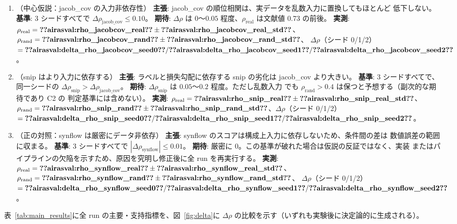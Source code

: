 \documentclass[11pt]{article}
\providecommand{\airasval}[1]{\textbf{??airasval:\detokenize{#1}??}}
\providecommand{\unverified}[1]{#1}
\begin{document}
\begin{enumerate}
  \item[\textbf{C1}]（中心仮説：jacob\_cov の入力非依存性）
  \textbf{主張}: jacob\_cov の順位相関は、実データを乱数入力に置換してもほとんど
  低下しない。
  \textbf{基準}: 3 シードすべてで $\Delta\rho_{\mathrm{jacob\_cov}} \le 0.10$。
  \textbf{期待}: $\Delta\rho$ は $0$〜$0.05$ 程度、$\rho_{\mathrm{real}}$ は文献値
  \unverified{0.73} の前後。
  \textbf{実測}: $\rho_{\mathrm{real}} = \airasval{rho_jacobcov_real} \pm
  \airasval{rho_jacobcov_real_std}$、$\rho_{\mathrm{rand}} =
  \airasval{rho_jacobcov_rand} \pm \airasval{rho_jacobcov_rand_std}$、
  $\Delta\rho$（シード 0/1/2）$= \airasval{delta_rho_jacobcov_seed0} /
  \airasval{delta_rho_jacobcov_seed1} / \airasval{delta_rho_jacobcov_seed2}$。

  \item[\textbf{C2}]（snip はより入力に依存する）
  \textbf{主張}: ラベルと損失勾配に依存する snip の劣化は jacob\_cov より大きい。
  \textbf{基準}: 3 シードすべてで、同一シードの
  $\Delta\rho_{\mathrm{snip}} > \Delta\rho_{\mathrm{jacob\_cov}}$。
  \textbf{期待}: $\Delta\rho_{\mathrm{snip}}$ は $0.05$〜$0.2$ 程度。ただし乱数入力
  でも $\rho_{\mathrm{rand}} > 0.4$ は保つと予想する（副次的な期待であり C2 の
  判定基準には含めない）。
  \textbf{実測}: $\rho_{\mathrm{real}} = \airasval{rho_snip_real} \pm
  \airasval{rho_snip_real_std}$、$\rho_{\mathrm{rand}} = \airasval{rho_snip_rand}
  \pm \airasval{rho_snip_rand_std}$、$\Delta\rho$（シード 0/1/2）$=
  \airasval{delta_rho_snip_seed0} / \airasval{delta_rho_snip_seed1} /
  \airasval{delta_rho_snip_seed2}$。

  \item[\textbf{C3}]（正の対照：synflow は厳密にデータ非依存）
  \textbf{主張}: synflow のスコアは構成上入力に依存しないため、条件間の差は
  数値誤差の範囲に収まる。
  \textbf{基準}: 3 シードすべてで $|\Delta\rho_{\mathrm{synflow}}| \le 0.01$。
  \textbf{期待}: 厳密に $0$。この基準が破れた場合は仮説の反証ではなく、実装
  またはパイプラインの欠陥を示すため、原因を究明し修正後に全 run を再実行する。
  \textbf{実測}: $\rho_{\mathrm{real}} = \airasval{rho_synflow_real} \pm
  \airasval{rho_synflow_real_std}$、$\rho_{\mathrm{rand}} =
  \airasval{rho_synflow_rand} \pm \airasval{rho_synflow_rand_std}$、
  $\Delta\rho$（シード 0/1/2）$= \airasval{delta_rho_synflow_seed0} /
  \airasval{delta_rho_synflow_seed1} / \airasval{delta_rho_synflow_seed2}$。
\end{enumerate}

表~\ref{tab:main_results}に全 run の主要・支持指標を、図~\ref{fig:delta}に
$\Delta\rho$ の比較を示す（いずれも実験後に決定論的に生成される）。
\end{document}
